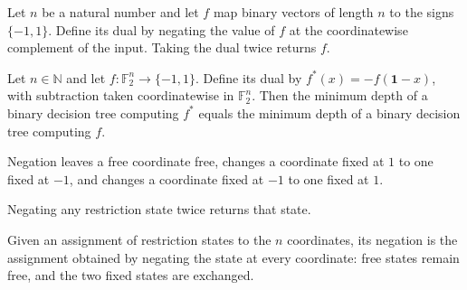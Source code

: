 \begin{theorem}
\label{FABL.binaryBooleanDual_involutive}
\leanok
{}
Let $n$ be a natural number and let $f$ map binary vectors of length $n$ to the signs
$\{-1,1\}$. Define its dual by negating the value of $f$ at the coordinatewise complement of
the input. Taking the dual twice returns $f$.
\end{theorem}

\begin{theorem}
\label{FABL.decisionTreeDepth_binaryBooleanDual}
\leanok
{}
Let $n\in\mathbb{N}$ and let $f:\mathbb{F}_2^n\to\{−1,1\}$. Define its dual by
$f^*(x)=-f(\mathbf{1}-x)$, with subtraction taken coordinatewise in $\mathbb{F}_2^n$.
Then the minimum depth of a binary decision tree computing $f^*$ equals the minimum
depth of a binary decision tree computing $f$.
\end{theorem}

\begin{definition}
\label{FABL.CoordRestriction.negateState}
\leanok
{}
Negation leaves a free coordinate free, changes a coordinate fixed at $1$ to one fixed
at $-1$, and changes a coordinate fixed at $-1$ to one fixed at $1$.
\end{definition}

\begin{theorem}
\label{FABL.CoordRestriction.negateState_involutive}
\leanok
{}
Negating any restriction state twice returns that state.
\end{theorem}

\begin{definition}
\label{FABL.CoordRestriction.negateAssignment}
\leanok
{}
Given an assignment of restriction states to the $n$ coordinates, its negation is the
assignment obtained by negating the state at every coordinate: free states remain free,
and the two fixed states are exchanged.
\end{definition}

